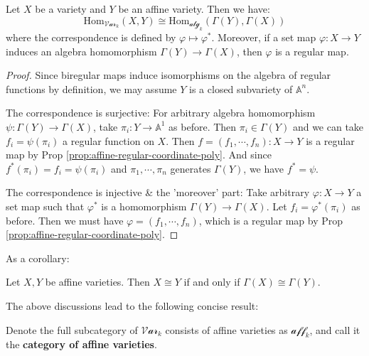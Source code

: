 \documentclass{note-eng}
\begin{document}
\begin{proposition}
    Let $X$ be a variety and $Y$ be an affine variety. Then we have:
    $$\mathrm{Hom}_{\mathscr{Var}_k}(X, Y) \cong \mathrm{Hom}_{\mathscr{alg}_k}(\Gamma(Y), \Gamma(X))$$
    where the correspondence is defined by $\varphi \mapsto \varphi^\ast$. Moreover, if a set map $\varphi: X \rightarrow Y$ induces an algebra homomorphism $\Gamma(Y) \rightarrow \Gamma(X)$, then $\varphi$ is a regular map.
\end{proposition}

\begin{proof}
    Since biregular maps induce isomorphisms on the algebra of regular functions by definition, we may assume $Y$ is a closed subvariety of $\mathbb{A}^n$.

    The correspondence is surjective: For arbitrary algebra homomorphism $\psi: \Gamma(Y) \rightarrow \Gamma(X)$, take $\pi_i: Y \rightarrow \mathbb{A}^1$ as before. Then $\pi_i \in \Gamma(Y)$ and we can take $f_i = \psi(\pi_i)$ a regular function on $X$. Then $f = (f_1, \cdots, f_n): X \rightarrow Y$ is a regular map by Prop \ref{prop:affine-regular-coordinate-poly}. And since $f^\ast (\pi_i) = f_i = \psi(\pi_i)$ and $\pi_1, \cdots, \pi_n$ generates $\Gamma(Y)$, we have $f^\ast = \psi$.

    The correspondence is injective \& the 'moreover' part: Take arbitrary $\varphi: X \rightarrow Y$ a set map such that $\varphi^ \ast$ is a homomorphism $\Gamma(Y) \rightarrow \Gamma(X)$. Let $f_i = \varphi^\ast(\pi_i)$ as before. Then we must have $\varphi = (f_1, \cdots, f_n)$, which is a regular map by Prop \ref{prop:affine-regular-coordinate-poly}.
\end{proof}

As a corollary:

\begin{corollary} 
    Let $X, Y$ be affine varieties. Then $X \cong Y$ if and only if $\Gamma(X) \cong \Gamma(Y)$.
\end{corollary}

The above discussions lead to the following concise result:

\begin{definition}
    Denote the full subcategory of $\mathscr{Var}_k$ consists of affine varieties as $\mathscr{aff}_k$, and call it the \textbf{category of affine varieties}.
\end{definition}
\end{document}
